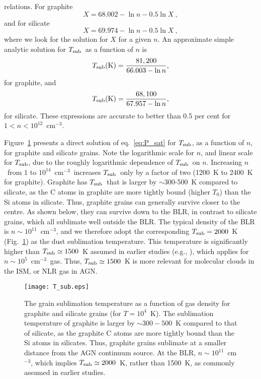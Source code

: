 \documentclass[a4paper,fleqn,usenatbib]{mnras}
\newcommand{\cmt}{cm$^{-3}$}
\newcommand{\ngas}{\mbox{$n$}}
\newcommand{\Tsub}{\mbox{$T_{\rm sub}$}}
\begin{document}
relations. For graphite
\begin{equation}
X = 68.002 -\ln n - 0.5\ln X \ , 
\end{equation}
and for silicate
\begin{equation}
X = 69.974 -\ln n - 0.5\ln X \ , 
\end{equation}
where we look for the solution for $X$ for a given $n$.
An approximate simple analytic solution for \Tsub\ as a function of $n$ is
\begin{equation}
\Tsub({\rm K}) = \frac{81,200}{66.003 -\ln n} , \label{eq:n_grap}
\end{equation}
for graphite, and 
\begin{equation}
\Tsub({\rm K}) = \frac{68,100}{67.957 -\ln n} , \label{eq:n_sil}
\end{equation}
for silicate. These expressions are accurate to better than 0.5 per cent for $1<n<10^{12}$~cm$^{-3}$.
	
Figure~\ref{fig:T_sub} presents a direct solution of eq.~\ref{eq:P_sat} for \Tsub,  as a function of \ngas, 
for graphite and silicate grains.  Note the logarithmic scale for \ngas, and linear scale for \Tsub, due to the
roughly logarithmic dependence of \Tsub\ on \ngas. Increasing \ngas\ from $1$ to $10^{14}$~\cmt\ increases \Tsub\ only by 
a factor of two (1200~K to 2400~K for graphite).
Graphite has \Tsub\ that is larger by $\sim 300$-500~K compared to silicate, as the C atoms in graphite are
more tightly bound (higher $T_0$) than the Si atoms in silicate. Thus, graphite grains can generally 
survive closer to the centre. As shown below, they can survive down to the BLR, in contrast to silicate grains, 
which all sublimate well outside the BLR. The typical density of the BLR is 
$\ngas\sim10^{11}$~\cmt, and we therefore adopt 
the corresponding $\Tsub=2000$~K (Fig.~\ref{fig:T_sub}) as the dust sublimation temperature. This temperature is significantly
higher than $\Tsub\simeq 1500$~K assumed in earlier studies (e.g., \citealt{Barvainis87, Schartmann2005, Nenkova2008}),
which applies for $\ngas\sim10^{5}$~\cmt\ gas. Thus, $\Tsub\simeq 1500$~K is more relevant for molecular 
clouds in the ISM, or NLR gas in AGN.
	
	

\begin{figure}
\texttt{[image: T\_sub.eps]}
\caption{The grain sublimation temperature as a function of gas density for graphite and silicate grains
(for $T=10^4$~K). The sublimation temperature of graphite is larger by 
$\sim 300-500$~K compared to that of silicate, as the graphite C atoms are more tightly bound than the Si atoms in silicates.
Thus, graphite grains sublimate at a smaller distance from the AGN continuum source.
At the BLR, $\ngas\sim10^{11}$~\cmt, which implies $\Tsub\simeq 2000$~K, rather than 1500~K, as commonly assumed in earlier studies.}
\label{fig:T_sub}
\end{figure}
		
\end{document}
